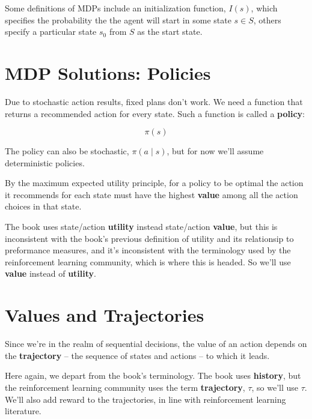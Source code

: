 \documentclass[11pt]{article}
\renewenvironment{quote}{\begin{shaded*}\begin{oldquote}}{\end{oldquote}\end{shaded*}}
\begin{document}
Some definitions of MDPs include an initialization function, \(I(s)\), which specifies the probability the the agent will start in some state \(s \in S\), others specify a particular state \(s_0\) from \(S\) as the start state.
\section{MDP Solutions: Policies}
\label{sec:org832d9b4}

Due to stochastic action results, fixed plans don't work.  We need a function that returns a recommended action for every state.  Such a function is called a \textbf{policy}:

\begin{equation*}
\pi(s)
\end{equation*}

The policy can also be stochastic, \(\pi(a \mid s)\), but for now we'll assume deterministic policies.

By the maximum expected utility principle, for a policy to be optimal the action it recommends for each state must have the highest \textbf{value} among all the action choices in that state.

\begin{quote}
The book uses state/action \textbf{utility} instead state/action \textbf{value}, but this is inconsistent with the book's previous definition of utility and its relationsip to preformance measures, and it's inconsistent with the terminology used by the reinforcement learning community, which is where this is headed.  So we'll use \textbf{value} instead of \textbf{utility}.
\end{quote}
\section{Values and Trajectories}
\label{sec:orgc771022}

Since we're in the realm of sequential decisions, the value of an action depends on the \textbf{trajectory} -- the sequence of states and actions -- to which it leads.

\begin{quote}
Here again, we depart from the book's terminology.  The book uses \textbf{history}, but the reinforcement learning community uses the term \textbf{trajectory}, \(\tau\), so we'll use \(\tau\).  We'll also add reward to the trajectories, in line with reinforcement learning literature.
\end{quote}
\end{document}
